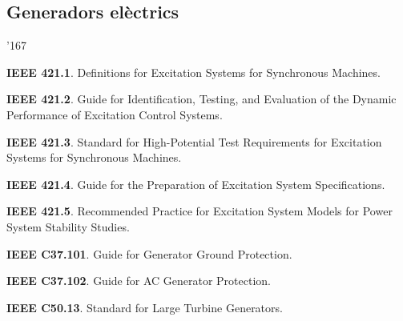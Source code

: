 \subsection*{Generadors el\`{e}ctrics}
\begin{dinglist}{'167}
    \item \textbf{IEEE 421.1}. Definitions for Excitation Systems for Synchronous Machines.
    \item \textbf{IEEE 421.2}. Guide for Identification, Testing, and Evaluation of the Dynamic Performance of Excitation Control Systems.
    \item \textbf{IEEE 421.3}. Standard for High-Potential Test Requirements for Excitation Systems for Synchronous Machines.
    \item \textbf{IEEE 421.4}. Guide for the Preparation of Excitation System Specifications.
    \item \textbf{IEEE 421.5}. Recommended Practice for Excitation System Models for Power System Stability Studies.
    \item \textbf{IEEE C37.101}. Guide for Generator Ground Protection.
    \item \textbf{IEEE C37.102}. Guide for AC Generator Protection.
    \item \textbf{IEEE C50.13}. Standard for Large Turbine Generators.
\end{dinglist}


